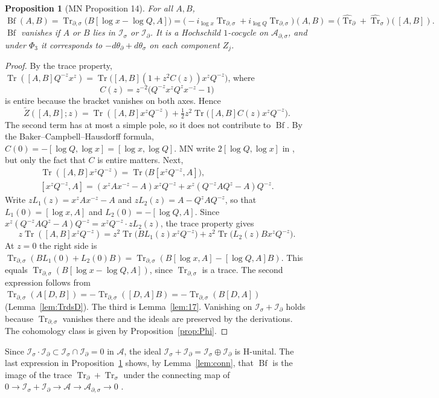 \documentclass[11pt,oneside,reqno]{article}
\DeclareMathOperator{\Tr}{Tr}
\DeclareMathOperator{\Bf}{Bf}
\newcommand{\cA}{\mathcal A}
\newcommand{\Is}{\mathcal I_\sigma}
\newcommand{\Id}{\mathcal I_\partial}
\newcommand{\Ads}{\mathcal A_{\partial,\sigma}}
\newcommand{\Trs}{\Tr_\sigma}
\newcommand{\Trd}{\Tr_\partial}
\newcommand{\Trds}{\Tr_{\partial,\sigma}}
\newcommand{\hTrs}{\widehat{\Tr}_\sigma}
\newcommand{\hTrd}{\widehat{\Tr}_\partial}
\newcommand{\lQ}{\log Q}
\newcommand{\lx}{\log x}
\theoremstyle{plain}
\newtheorem{proposition}[theorem]{Proposition}
\theoremstyle{definition}
\theoremstyle{remark}
\begin{document}
\begin{proposition}[MN Proposition 14]\label{prop:Bf}
For all \(A,B\),
\[
 \Bf(A,B)=\Trds\bigl(B[\lx-\lQ,A]\bigr)=\bigl(-i_{\lx}\Trds+i_{\lQ}\Trds
 \bigr)(A,B)=\bigl(\hTrd+\hTrs\bigr)([A,B]).
\]
\(\Bf\) vanishes if \(A\) or \(B\) lies in \(\Is\) or \(\Id\). It is a
Hochschild \(1\)-cocycle on \(\Ads\), and under \(\Phi_3\) it corresponds
to \(-d\theta_\partial+d\theta_\sigma\) on each component \(Z_j\).
\end{proposition}

\begin{proof}
By the trace property, \(\Tr([A,B]Q^{-z}x^z)=\Tr\bigl([A,B](1+z^2C(z))
x^zQ^{-z}\bigr)\), where
\[
 C(z)=z^{-2}\bigl(Q^{-z}x^zQ^zx^{-z}-1\bigr)
\]
is entire because the bracket vanishes on both axes. Hence \cite[(79)]{MN}
\[
 \widetilde Z([A,B];z)=\Tr([A,B]x^zQ^{-z})+\tfrac12z^2\Tr\bigl([A,B]C(z)
 x^zQ^{-z}\bigr).
\]
The second term has at most a simple pole, so it does not contribute to
\(\Bf\). By the Baker--Campbell--Hausdorff formula,
\(C(0)=-[\lQ,\lx]=[\lx,\lQ]\). MN write \(2[\lQ,\lx]\) in \cite[(80)]{MN},
but only the fact that \(C\) is entire matters. Next,
\begin{gather*}
 \Tr([A,B]x^zQ^{-z})=\Tr\bigl(B[x^zQ^{-z},A]\bigr),\\
 [x^zQ^{-z},A]=(x^zAx^{-z}-A)x^zQ^{-z}+x^z(Q^{-z}AQ^z-A)Q^{-z}.
\end{gather*}
Write \(zL_1(z)=x^zAx^{-z}-A\) and \(zL_2(z)=A-Q^zAQ^{-z}\), so that
\(L_1(0)=[\lx,A]\) and \(L_2(0)=-[\lQ,A]\). Since
\(x^z(Q^{-z}AQ^z-A)Q^{-z}=x^zQ^{-z}\cdot zL_2(z)\), the trace property
gives \cite[(81)]{MN}
\[
 z\Tr([A,B]x^zQ^{-z})=z^2\Tr\bigl(BL_1(z)x^zQ^{-z}\bigr)+z^2\Tr\bigl(
 L_2(z)Bx^zQ^{-z}\bigr).
\]
At \(z=0\) the right side is \(\Trds(BL_1(0)+L_2(0)B)=\Trds(B[\lx,A]-
[\lQ,A]B)\). This equals \(\Trds(B[\lx-\lQ,A])\), since \(\Trds\) is a
trace. The second expression follows from
\(\Trds(A[D,B])=-\Trds([D,A]B)=-\Trds(B[D,A])\)
(Lemma~\ref{lem:TrdsD}). The third is Lemma~\ref{lem:17}. Vanishing on
\(\Is+\Id\) holds because \(\Trds\) vanishes there and the ideals are
preserved by the derivations. The cohomology class is given by
Proposition~\ref{prop:Phi}.
\end{proof}

Since \(\Is\cdot\Id\subset\Is\cap\Id=0\) in \(\cA\), the ideal
\(\Is+\Id=\Is\oplus\Id\) is H-unital. The last expression in
Proposition~\ref{prop:Bf} shows, by Lemma~\ref{lem:conn}, that \(\Bf\) is
the image of the trace \(\Trd+\Trs\) under the connecting map of
\(0\to\Is+\Id\to\cA\to\Ads\to0\) \cite[p.~28]{MN}.
\end{document}
